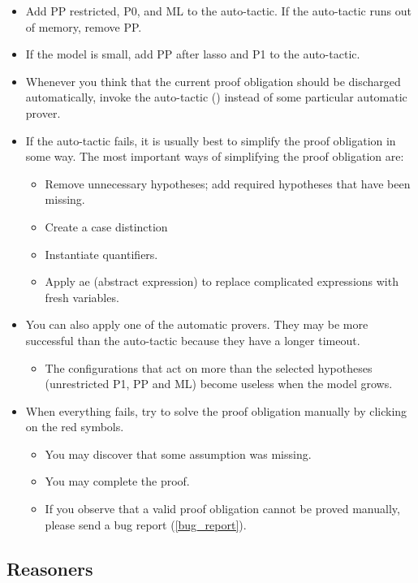 \begin{itemize}
	\item Add PP restricted, P0, and ML to the auto-tactic. If the auto-tactic runs out of memory, remove PP.
	\item If the model is small, add PP after lasso and P1 to the auto-tactic.
	\item Whenever you think that the current proof obligation should be discharged automatically, invoke the auto-tactic () instead of some particular automatic prover.
	\item If the auto-tactic fails, it is usually best to simplify the proof obligation in some way. The most important ways of simplifying the proof obligation are:
	\begin{itemize}
		\item Remove unnecessary hypotheses; add required hypotheses that have been missing.
		\item Create a case distinction
		\item Instantiate quantifiers.
		\item Apply ae (abstract expression) to replace complicated expressions with fresh variables. 
	\end{itemize}
	\item You can also apply one of the automatic provers. They may be more successful than the auto-tactic because they have a longer timeout.
	\begin{itemize}
		\item The configurations that act on more than the selected hypotheses (unrestricted P1, PP and ML) become useless when the model grows. 
	\end{itemize}
	\item When everything fails, try to solve the proof obligation manually by clicking on the red symbols.
	\begin{itemize}
		\item You may discover that some assumption was missing.
		\item You may complete the proof.
		\item If you observe that a valid proof obligation cannot be proved manually, please send a bug report (\ref{bug_report}).
	\end{itemize}
\end{itemize}

\subsection{Reasoners}
\label{reasoners}

